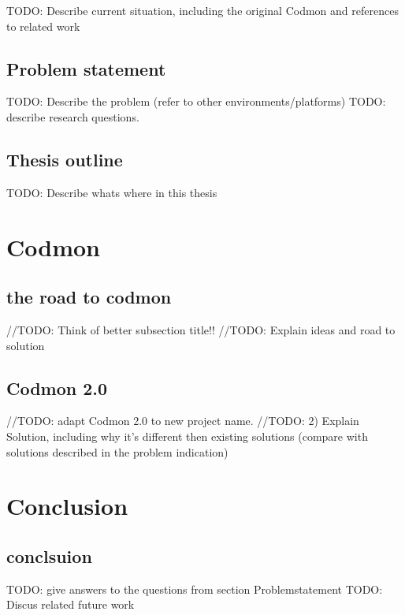 \documentclass[a4paper,10pt]{scrartcl}
\begin{document}
TODO: Describe current situation, including the original Codmon and references to related work

\subsection{Problem statement}
\label{subsec:Problemstatement}
TODO: Describe the problem (refer to other environments/platforms)
TODO: describe research questions.

\subsection{Thesis outline}
\label{subsec:Thesisoutline}
TODO: Describe whats where in this thesis

\newpage

\section{Codmon}
\label{sec:codmon}

\subsection{the road to codmon}
//TODO: Think of better subsection title!!
//TODO: Explain ideas and road to solution

\subsection{Codmon 2.0}
//TODO: adapt Codmon 2.0 to new project name.
//TODO: 2) Explain Solution, including why it's different then existing solutions (compare with solutions described in the problem indication)

\newpage
\section{Conclusion}
\subsection{conclsuion}
TODO: give answers to the questions from section Problemstatement
TODO: Discus related future work
\newpage


\end{document}
